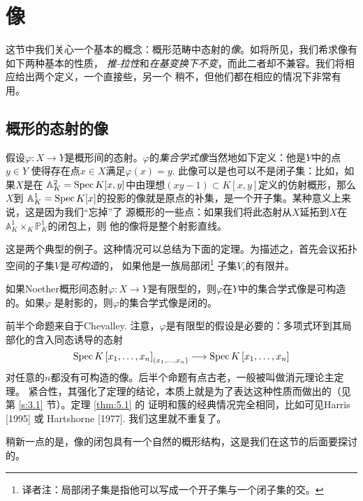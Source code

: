 \section{像}\label{s:5.1}


这节中我们关心一个基本的概念：概形范畴中态射的\textit{像}。如将所见，我们希求像有如下两种基本的性质，
\textit{推-拉性}和\textit{在基变换下不变}，而此二者却不兼容。我们将相应给出两个定义，一个直接些，另一个
稍不，但他们都在相应的情况下非常有用。

\subsection{概形的态射的像}\label{s:5.1.1}

假设$\varphi:X\to Y$是概形间的态射。$\varphi$的\textit{集合学式像}当然地如下定义：他是$Y$中的点$y\in Y$
使得存在点$x\in X$满足$\varphi(x)=y$. 此像可以是也可以不是闭子集：比如，如果$X$是在
$\mathbb{A}_K^2=\operatorname{Spec} K[x, y]$中由理想$(xy-1)\subset K[x,y]$定义的仿射概形，那么$X$到
$\mathbb{A}_K^1=\operatorname{Spec} K[x]$的投影的像就是原点的补集，是一个开子集。某种意义上来说，这是因为我们“忘掉”了
源概形的一些点：如果我们将此态射从$X$延拓到$X$在$\mathbb{A}_K^1 \times_K \mathbb{P}_K^1$的闭包上，则
他的像将是整个射影直线。

这是两个典型的例子。这种情况可以总结为下面的定理。为描述之，首先会议拓扑空间的子集$V$是\textit{可构造}的，
如果他是一族局部闭\footnote{译者注：局部闭子集是指他可以写成一个开子集与一个闭子集的交。}%
子集$V_i$的有限并。


\begin{thm}\label{thm:5.1}
    如果Noether概形间态射$\varphi: X\to Y$是有限型的，则$\varphi$在$Y$中的集合学式像是可构造的。如果$\varphi$
    是射影的，则$\varphi$的集合学式像是闭的。
\end{thm}

前半个命题来自于Chevalley. 注意，$\varphi$是有限型的假设是必要的：多项式环到其局部化的含入同态诱导的态射
\[
    \operatorname{Spec} K\left[x_1, \ldots, x_n\right]_{\left(x_1, \ldots, x_n\right)} \longrightarrow 
    \operatorname{Spec} K\left[x_1, \ldots, x_n\right]
\]
对任意的$n$都没有可构造的像。后半个命题有点古老，一般被叫做消元理论主定理。
紧合性，其强化了定理的结论，本质上就是为了表达这种性质而做出的（见第 \ref{s:3.1} 节）。定理 \ref{thm:5.1} 的
证明和簇的经典情况完全相同，比如可见Harris [1995] 或 Hartshorne [1977]. 我们这里就不重复了。

稍新一点的是，像的闭包具有一个自然的概形结构，这是我们在这节的后面要探讨的。

